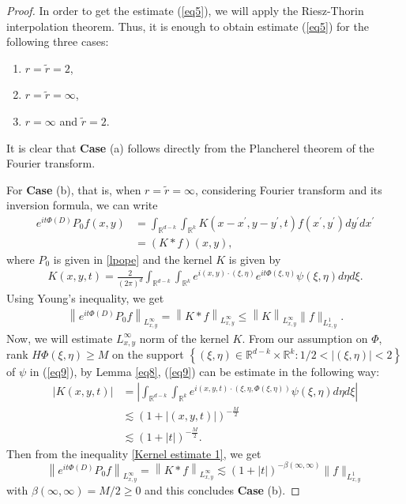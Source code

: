 \documentclass[a4paper,11pt, reqno]{amsart}
\theoremstyle{definition}
\theoremstyle{remark}
\numberwithin{equation}{section}
\begin{document}
	\begin{proof} In order to get the estimate (\ref{eq5}), we will apply  the Riesz-Thorin interpolation theorem. Thus, it is enough to obtain estimate (\ref{eq5})  for the following three cases:
 \begin{enumerate}
 \item $r=\widetilde{r}=2$,
 \item  $r=\widetilde{r}=\infty$,
 \item  $r=\infty$ and $\tilde{r}=2$.
 \end{enumerate}
 
 It is clear that \textbf{Case} (a) follows directly from the Plancherel theorem of the Fourier transform. 
        
        For \textbf{Case} (b), that is, when  $r=\widetilde{r}=\infty$,  considering Fourier transform and its inversion formula, we can write
		$$
		\begin{aligned}
			e^{i t\Phi(D)} P_0 f(x, y) & =\int_{\mathbb{R}^{d-k}} \int_{\mathbb{R}^k} K\left(x-x^{\prime}, y-y^{\prime}, t\right) f\left(x^{\prime}, y^{\prime}\right) d y^{\prime} d x^{\prime} \\
			& =(K * f)(x,y),
		\end{aligned}
		$$
		where $P_0$ is given in \eqref{lpope} and the kernel $K$ is given by 
		\begin{align}\label{eq9}
			K(x, y, t)= \frac{2}{(2\pi)^d}\int_{\mathbb{R}^{d-k}} \int_{\mathbb{R}^k} e^{i(x, y) \cdot(\xi, \eta)} e^{i t \Phi(\xi, \eta)} \psi(\xi, \eta) d \eta d \xi.  
		\end{align}
		Using  Young's inequality, we get
		\begin{align}\label{Kernel estimate 1}
			\left\|e^{i t\Phi(D)} P_0 f\right\|_{L_{x, y}^{\infty}}=\left\|K * f\right\|_{L_{x, y}^{\infty}} \leq\left\|K\right\|_{L_{x, y}^{\infty}}\|f\|_{L_{x, y}^1} .
		\end{align}
		Now, we will estimate $L_{x, y}^{\infty}$  norm of the kernel $K$.    From our assumption on $\Phi$,  rank $H \Phi(\xi, \eta) \geq M$ on  the support $\left\{(\xi, \eta) \in \mathbb{R}^{d-k} \times \mathbb{R}^k: 1 / 2<|(\xi, \eta)|<2\right\}$ of $\psi$ in (\ref{eq9}),  by  Lemma \ref{eq8},    (\ref{eq9})  can be estimate in the following way:
		$$
		\begin{aligned}
			\left|K(x, y, t)\right| & =\left|\int_{\mathbb{R}^{d-k}} \int_{\mathbb{R}^k} e^{i(x, y, t) \cdot\left(\xi, \eta,\Phi(\xi, \eta)\right)} \psi(\xi, \eta) d \eta d \xi\right| \\
			& \lesssim(1+|(x, y, t)|)^{-\frac{M}{2}} \\
			& \lesssim(1+|t|)^{-\frac{M}{2}}.
		\end{aligned}
		$$
		Then from the inequality \eqref{Kernel estimate 1}, we get 
		$$		\left\|e^{i t\Phi(D)} P_0 f\right\|_{L_{x, y}^{\infty}}=\left\|K * f\right\|_{L_{x, y}^{\infty}}   \lesssim(1+|t|)^{-\beta(\infty, \infty)} \|f\|_{L_{x, y}^1} $$
		with $ \beta(\infty, \infty)=M / 2 \geq 0$ and   this concludes {\bf Case} (b). 
		

\end{proof}
\end{document}
